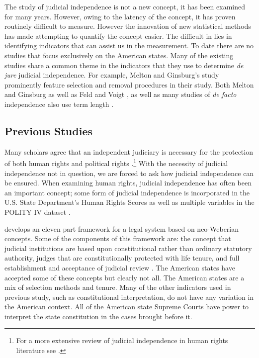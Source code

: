 \documentclass[12pt]{article}
\begin{document}
The study of judicial independence is not a new concept, it has been examined for many years.  However, owing to the latency of the concept, it has proven routinely difficult to measure.  However the innovation of new statistical methods has made attempting to quantify the concept easier.  The difficult in lies in identifying indicators that can assist us in the measurement.  To date there are no studies that focus exclusively on the American states.  Many of the existing studies share a common theme in the indicators that they use to determine \textit{de jure} judicial independence.  For example, Melton and Ginsburg's \citeyearpar{Melton2014} study prominently feature selection and removal procedures in their study.  Both Melton and Ginsburg \citeyearpar{Melton2014} as well as Feld and Voigt \citeyearpar{Feld2003}, as well as many studies of \textit{de facto} independence also use term length \citep{Laporta2004, Feld2003, Cingranelli2008, Apodaca2004}. 

\subsection*{Previous Studies}%
Many scholars agree that an independent judiciary is necessary for the protection of both human rights and political rights \citep{Keith2002a,Keith2002b,Howard2004,Russell2001}.\footnote{For a more extensive review of judicial independence in human rights literature see \citep[Footnote 1]{Keith2002b}.}  With the necessity of judicial independence not in question, we are forced to ask how judicial independence can be ensured.  When examining human rights, judicial independence has often been an important concept; some form of judicial independence is incorporated in the U.S. State Department's Human Rights Scores as well as multiple variables in the POLITY IV dataset \citep{Cingranelli2008, Polity,Howard2004}.

\citet{Schmidhauser1987} develops an eleven part framework for a legal system based on neo-Weberian concepts.  Some of the components of this framework are: the concept that judicial institutions are based upon constitutional rather than ordinary statutory authority,  judges that are constitutionally protected with life tenure, and full establishment and acceptance of judicial review \cite[46-47]{Schmidhauser1987}.  The American states have accepted some of these concepts but clearly not all.  The American states are a mix of selection methods and tenure.  Many of the other indicators used in previous study, such as constitutional interpretation, do not have any variation in the American context.  All of the American state Supreme Courts have power to interpret the state constitution in the cases brought before it.
\end{document}
